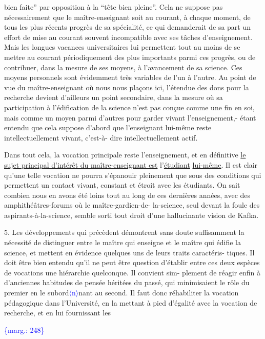 \documentclass[11pt]{article}
\newcommand{\scanpage}[1]{\par\bigskip\noindent{\small\sffamily[scan #1]}\par}
\newcommand{\mspage}[1]{{\small\sffamily[p.\,#1]}}
\let\over\relax
\newcommand{\over}[2]{\textcolor{gray}{#1}\textcolor{blue}{\ensuremath{^{\!\nearrow}}#2}}
\newcommand{\inserted}[2][]{\textcolor{blue}{$\langle$#2$\rangle$}}
\newcommand{\margin}[1]{\textcolor{blue}{\{\textsf{marg.:} #1\}}}
\newcommand{\uline}[1]{\underline{#1}}
\newcommand{\unsure}[1]{[#1?]}
\begin{document}
bien faite'' par opposition à la ``tête bien pleine''. Cela ne suppose pas
nécessairement que le maître-enseignant soit au courant, à chaque moment,
de tous les plus récents progrès de sa spécialité, ce qui demanderait de sa
part un effort de mise au courant souvent incompatible avec ses tâches
d'enseignement. Mais les longues vacances universitaires lui permettent
tout au moins de se mettre au courant périodiquement des plus importants
parmi ces progrès, ou de contribuer, dans la mesure de ses moyens, à
l'avancement de sa science. Ces moyens personnels sont évidemment très
variables de l'un à l'autre. Au point de vue du maître-enseignant où nous
nous plaçons ici, l'étendue des dons pour la recherche devient d'ailleurs
un point secondaire, dans la mesure où sa participation à l'édification de
la science n'est pas conçue comme une fin en soi, mais comme un moyen parmi
d'autres pour garder vivant l'enseignement,- étant entendu que cela suppose
d'abord que l'enseignant lui-même reste intellectuellement vivant, c'est-à-%
dire intellectuellement actif.

Dans tout cela, la vocation principale reste l'enseignement, et
en définitive \uline{le sujet principal d'intérêt du maître-enseignant est} l'\uline{étudiant}
\uline{lui-même}. Il est clair qu'une telle vocation ne pourra s'épanouir pleinement
que sous des conditions qui permettent un contact vivant, constant et étroit
avec les étudiants. On sait combien nous en avons été loins tout au long de
ces dernières années, avec des amphithéâtres-forums où le maître-gardien-de-%
la-science, seul devant la foule des aspirants-à-la-science, semble sorti
tout droit d'une hallucinante vision de Kafka.


5. Les développements qui précèdent démontrent sans doute suffisamment la
nécessité de distinguer entre le maître qui enseigne et le maître qui édifie
la science, et mettent en évidence quelques uns de leurs traits caractéris-%
tiques. Il doit être bien entendu qu'il ne peut être question d'établir entre
ces deux espèces de vocations une hiérarchie quelconque. Il convient sim-%
plement de réagir enfin à d'anciennes habitudes de pensée héritées du passé,
qui minimisaient le rôle du premier en le subord\over{\unsure{o}}{o}\inserted{n}nant au second. Il faut
donc réhabiliter la vocation pédagogique dans l'Université, en la mettant
à pied d'égalité avec la vocation de recherche, et en lui fournissant les

\margin{248}

\clearpage
\scanpage{119/249}
\mspage{9}
\end{document}
